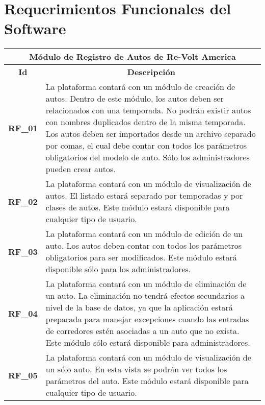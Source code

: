 \section{Requerimientos Funcionales del Software}
\begin{center}
	\begin{tabular}{ | l | p{15cm} |}
		\hline
		\multicolumn{2}{|c|}{\textbf{Módulo de Registro de Autos de Re-Volt America}} \\
		\hline
		\multicolumn{1}{|c|}{\textbf{Id}} & \multicolumn{1}{|c|}{\textbf{Descripción}} \\
		\hline
		{\textbf{RF\_01}} & La plataforma contará con un módulo de creación de autos. Dentro de este módulo, los autos deben ser relacionados con una temporada. No podrán existir autos con nombres duplicados dentro de la misma temporada. Los autos deben ser importados desde un archivo separado por comas, el cual debe contar con todos los parámetros obligatorios del modelo de auto. Sólo los administradores pueden crear autos. \\ \hline

		{\textbf{RF\_02}} & La plataforma contará con un módulo de visualización de autos. El listado estará separado por temporadas y por clases de autos. Este módulo estará disponible para cualquier tipo de usuario. \\ \hline

		{\textbf{RF\_03}} & La plataforma contará con un módulo de edición de un auto. Los autos deben contar con todos los parámetros obligatorios para ser modificados. Este módulo estará disponible sólo para los administradores. \\ \hline
		
		{\textbf{RF\_04}} & La plataforma contará con un módulo de eliminación de un auto. La eliminación no tendrá efectos secundarios a nivel de la base de datos, ya que la aplicación estará preparada para manejar excepciones cuando las entradas de corredores estén asociadas a un auto que no exista. Este módulo sólo estará disponible para administradores. \\ \hline
		
		{\textbf{RF\_05}} & La plataforma contará con un módulo de visualización de un sólo auto. En esta vista se podrán ver todos los parámetros del auto. Este módulo estará disponible para cualquier tipo de usuario. \\ \hline
	\end{tabular}
\end{center}


